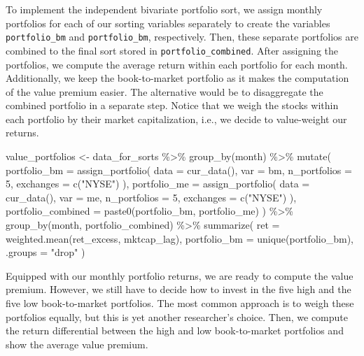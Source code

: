 \documentclass[
]{krantz}
\newenvironment{Shaded}{\begin{snugshade}}{\end{snugshade}}
\newcommand{\AttributeTok}[1]{\textcolor[rgb]{0.61,0.61,0.61}{#1}}
\newcommand{\DecValTok}[1]{\textcolor[rgb]{0.06,0.06,0.06}{#1}}
\newcommand{\FunctionTok}[1]{\textcolor[rgb]{0,0,0}{#1}}
\newcommand{\NormalTok}[1]{#1}
\newcommand{\OtherTok}[1]{\textcolor[rgb]{0.37,0.37,0.37}{#1}}
\newcommand{\SpecialCharTok}[1]{\textcolor[rgb]{0,0,0}{#1}}
\newcommand{\StringTok}[1]{\textcolor[rgb]{0.5,0.5,0.5}{#1}}
\begin{document}
To implement the independent bivariate portfolio sort, we assign monthly portfolios for each of our sorting variables separately to create the variables \texttt{portfolio\_bm} and \texttt{portfolio\_bm}, respectively. Then, these separate portfolios are combined to the final sort stored in \texttt{portfolio\_combined}. After assigning the portfolios, we compute the average return within each portfolio for each month. Additionally, we keep the book-to-market portfolio as it makes the computation of the value premium easier. The alternative would be to disaggregate the combined portfolio in a separate step. Notice that we weigh the stocks within each portfolio by their market capitalization, i.e., we decide to value-weight our returns.

\begin{Shaded}
\begin{Highlighting}[]
\NormalTok{value\_portfolios }\OtherTok{\textless{}{-}}\NormalTok{ data\_for\_sorts }\SpecialCharTok{\%\textgreater{}\%}
  \FunctionTok{group\_by}\NormalTok{(month) }\SpecialCharTok{\%\textgreater{}\%}
  \FunctionTok{mutate}\NormalTok{(}
    \AttributeTok{portfolio\_bm =} \FunctionTok{assign\_portfolio}\NormalTok{(}
      \AttributeTok{data =} \FunctionTok{cur\_data}\NormalTok{(),}
      \AttributeTok{var =}\NormalTok{ bm,}
      \AttributeTok{n\_portfolios =} \DecValTok{5}\NormalTok{,}
      \AttributeTok{exchanges =} \FunctionTok{c}\NormalTok{(}\StringTok{"NYSE"}\NormalTok{)}
\NormalTok{    ),}
    \AttributeTok{portfolio\_me =} \FunctionTok{assign\_portfolio}\NormalTok{(}
      \AttributeTok{data =} \FunctionTok{cur\_data}\NormalTok{(),}
      \AttributeTok{var =}\NormalTok{ me,}
      \AttributeTok{n\_portfolios =} \DecValTok{5}\NormalTok{,}
      \AttributeTok{exchanges =} \FunctionTok{c}\NormalTok{(}\StringTok{"NYSE"}\NormalTok{)}
\NormalTok{    ),}
    \AttributeTok{portfolio\_combined =} \FunctionTok{paste0}\NormalTok{(portfolio\_bm, portfolio\_me)}
\NormalTok{  ) }\SpecialCharTok{\%\textgreater{}\%}
  \FunctionTok{group\_by}\NormalTok{(month, portfolio\_combined) }\SpecialCharTok{\%\textgreater{}\%}
  \FunctionTok{summarize}\NormalTok{(}
    \AttributeTok{ret =} \FunctionTok{weighted.mean}\NormalTok{(ret\_excess, mktcap\_lag),}
    \AttributeTok{portfolio\_bm =} \FunctionTok{unique}\NormalTok{(portfolio\_bm),}
    \AttributeTok{.groups =} \StringTok{"drop"}
\NormalTok{  )}
\end{Highlighting}
\end{Shaded}

Equipped with our monthly portfolio returns, we are ready to compute the value premium. However, we still have to decide how to invest in the five high and the five low book-to-market portfolios. The most common approach is to weigh these portfolios equally, but this is yet another researcher's choice. Then, we compute the return differential between the high and low book-to-market portfolios and show the average value premium.
\end{document}
